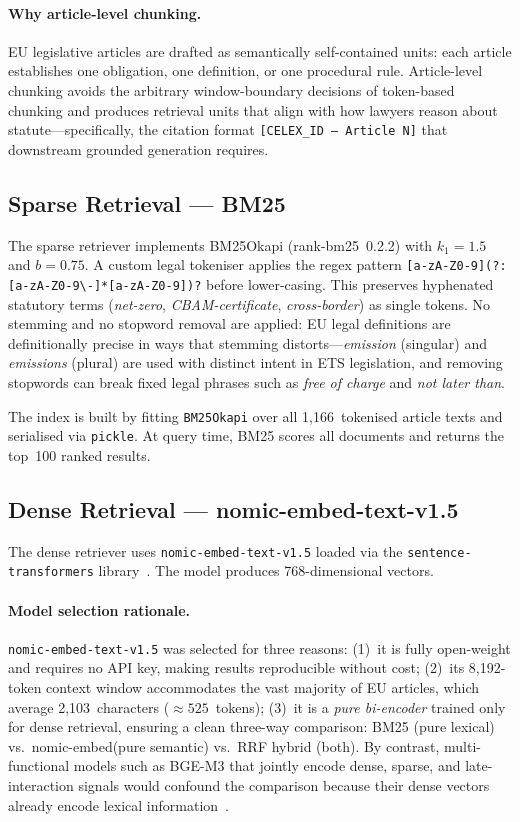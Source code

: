\documentclass[sigconf,screen]{acmart}
\newcommand{\nomic}{\texttt{nomic-embed-text-v1.5}\xspace}
\newcommand{\nomicshort}{nomic-embed\xspace}
\newcommand{\rrf}{RRF\xspace}
\begin{document}
\paragraph{Why article-level chunking.}
EU legislative articles are drafted as semantically self-contained
units: each article establishes one obligation, one definition, or
one procedural rule.  Article-level chunking avoids the arbitrary
window-boundary decisions of token-based chunking and produces
retrieval units that align with how lawyers reason about
statute---specifically, the citation format
\texttt{[CELEX\_ID\,---\,Article\,N]} that downstream grounded
generation requires.

\subsection{Sparse Retrieval --- BM25}
\label{sec:sparse}

The sparse retriever implements BM25Okapi (rank-bm25~0.2.2) with
$k_1{=}1.5$ and $b{=}0.75$.  A custom legal tokeniser applies the
regex pattern
\texttt{[a-zA-Z0-9](?:[a-zA-Z0-9\textbackslash-]*[a-zA-Z0-9])?}
before lower-casing.  This preserves hyphenated statutory terms
(\textit{net-zero}, \textit{CBAM-certificate}, \textit{cross-border})
as single tokens.  No stemming and no stopword removal are applied:
EU legal definitions are definitionally precise in ways that stemming
distorts---\textit{emission} (singular) and \textit{emissions}
(plural) are used with distinct intent in ETS legislation, and
removing stopwords can break fixed legal phrases such as
\textit{free of charge} and \textit{not later than}.

The index is built by fitting \texttt{BM25Okapi} over all
1{,}166~tokenised article texts and serialised via \texttt{pickle}.
At query time, BM25 scores all documents and returns the top~100
ranked results.

\subsection{Dense Retrieval --- nomic-embed-text-v1.5}
\label{sec:dense}

The dense retriever uses \nomic loaded via the
\texttt{sentence-transformers}
library~\cite{reimers2019sbert,nussbaum2024nomic}.  The model
produces 768-dimensional vectors.

\paragraph{Model selection rationale.}
\nomic was selected for three reasons: (1)~it is fully open-weight
and requires no API key, making results reproducible without cost;
(2)~its 8{,}192-token context window accommodates the vast majority
of EU articles, which average 2{,}103~characters
(${\approx}525$~tokens); (3)~it is a \emph{pure bi-encoder} trained
only for dense retrieval, ensuring a clean three-way comparison:
BM25 (pure lexical) vs.\ \nomicshort (pure semantic) vs.\ \rrf
hybrid (both).  By contrast, multi-functional models such as BGE-M3
that jointly encode dense, sparse, and late-interaction signals
would confound the comparison because their dense vectors already
encode lexical information~\cite{nussbaum2024nomic}.
\end{document}
